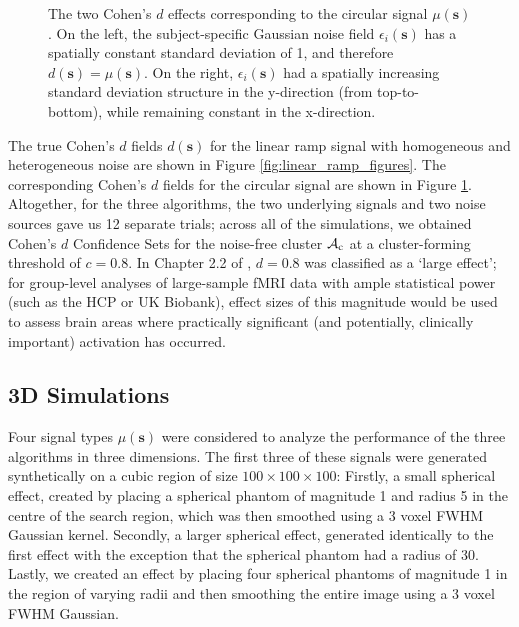 \begin{figure}[htbp]
  \centering
  \hspace{1em}
  \caption{The two Cohen's $d$ effects corresponding to the circular signal $\mu(\bm{s})$. On the left, the subject-specific Gaussian noise field $\epsilon_{i}(\bm{s})$ has a spatially constant standard deviation of 1, and therefore $d(\bm{s}) = \mu(\bm{s})$. On the right, $\epsilon_{i}(\bm{s})$ had a spatially increasing standard deviation structure in the y-direction (from top-to-bottom), while remaining constant in the x-direction.} 
\label{fig:circle_figures}
\end{figure}

The true Cohen's $d$ fields $d(\bm{s})$ for the linear ramp signal with homogeneous and heterogeneous noise are shown in Figure \ref{fig:linear_ramp_figures}. The corresponding Cohen's $d$ fields for the circular signal are shown in Figure \ref{fig:circle_figures}. Altogether, for the three algorithms, the two underlying signals and two noise sources gave us 12 separate trials; across all of the simulations, we obtained Cohen's $d$ Confidence Sets for the noise-free cluster $\operatorname{\mathcal{A}_{c}}$ at a cluster-forming threshold of $c = 0.8$. In Chapter 2.2 of \textit{\citet*{Cohen2013-it}}, $d=0.8$ was classified as a `large effect'; for group-level analyses of large-sample fMRI data with ample statistical power (such as the HCP or UK Biobank), effect sizes of this magnitude would be used to assess brain areas where practically significant (and potentially, clinically important) activation has occurred.



\subsection{3D Simulations}
Four signal types $\mu(\bm{s})$ were considered to analyze the performance of the three algorithms in three dimensions. The first three of these signals were generated synthetically on a cubic region of size $100 \times 100 \times 100$: Firstly, a small spherical effect, created by placing a spherical phantom of magnitude 1 and radius 5 in the centre of the search region, which was then smoothed using a 3 voxel FWHM Gaussian kernel. Secondly, a larger spherical effect, generated identically to the first effect with the exception that the spherical phantom had a radius of 30. Lastly, we created an effect by placing four spherical phantoms of magnitude 1 in the region of varying radii and then smoothing the entire image using a 3 voxel FWHM Gaussian. 

